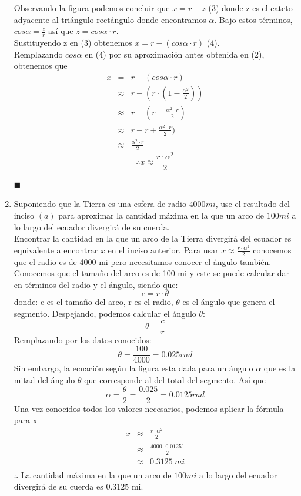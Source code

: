 \documentclass[12pt]{article}
\begin{document}
\begin{enumerate}[label=(\alph*)]
Observando la figura podemos concluir que $x = r - z$ (3) donde z es el cateto adyacente al triángulo rectángulo donde encontramos $\alpha$.
Bajo estos términos, $cos\alpha = \frac{z}{r} $ así que $z = cos \alpha \cdot r$.\\
Sustituyendo z  en (3) obtenemos $x = r -(cos \alpha \cdot r) $ (4).\\
Remplazando $cos\alpha$  en (4) por su aproximación antes obtenida en (2), obtenemos que 
\begin{eqnarray}
x
& = &  r -(cos \alpha \cdot r) \nonumber
\\
& \approx & r -(r \cdot (1 - \frac{\alpha^2}{2})) \nonumber
\\
& \approx  & r -(r - \frac{\alpha^2 \cdot r}{2}) \nonumber
\\
& \approx & r -r + \frac{\alpha^2 \cdot r}{2}) \nonumber
\\
& \approx & \frac{\alpha^2 \cdot r}{2} \nonumber
\end{eqnarray}
\[
\therefore x \approx \frac{r \cdot \alpha^2 }{2}
\]
\begin{flushright}
$\blacksquare$
\end{flushright}
\item Suponiendo que la Tierra es una esfera de radio $4000 mi$, use el resultado del inciso $(a)$ para aproximar la cantidad máxima en la que un arco de $100 mi$ a lo largo del ecuador divergirá de su cuerda.\\
Encontrar la cantidad en la que un arco de la Tierra divergirá del ecuador es equivalente a encontrar $x$ en el inciso anterior.
Para usar $x \approx \frac{r \cdot \alpha^2 }{2}$ conocemos que el radio es de 4000 mi pero necesitamos conocer el ángulo también. \\
Conocemos que el tamaño del arco es de 100 mi y este se puede calcular dar en términos del radio y el ángulo, siendo que:
\[
c = r \cdot \theta
\]
donde:
c es el tamaño del arco,
r es el radio,
$\theta$ es el ángulo que genera el segmento.
Despejando, podemos calcular el ángulo $\theta$:
\[
\theta = \frac{c}{r}
\]
Remplazando por los datos conocidos:
\[
\theta = \frac{100}{4000} = 0.025 rad
\]
Sin embargo, la ecuación según la figura esta dada para un ángulo $\alpha$ que es la mitad del ángulo $\theta$ que corresponde al del total del segmento.	Así que
\[
\alpha = \frac{\theta}{2} = \frac{0.025}{2}= 0.0125 rad
\]
Una vez conocidos todos los valores necesarios, podemos aplicar la fórmula para x
\begin{eqnarray}
x
& \approx &  \frac{r \cdot \alpha^2 }{2} \nonumber
\\
& \approx & \frac{4000 \cdot 0.0125^2 }{2} \nonumber
\\
& \approx  & 0.3125 ~ mi\nonumber
\\
\end{eqnarray}
$\therefore$  La cantidad máxima en la que un arco de $100 mi$ a lo largo del ecuador divergirá de su cuerda es 0.3125 mi.

\end{enumerate}
\end{document}
